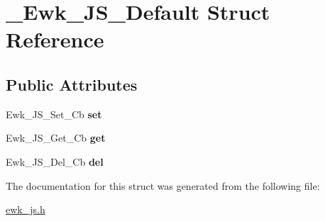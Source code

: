 \hypertarget{struct__Ewk__JS__Default}{\section{\+\_\+\+Ewk\+\_\+\+J\+S\+\_\+\+Default Struct Reference}
\label{struct__Ewk__JS__Default}
}
\subsection*{Public Attributes}
\begin{DoxyCompactItemize}
\item 
\hypertarget{struct__Ewk__JS__Default_a2e25ff1412c3e129e9ba02c422cc5dd7}{Ewk\+\_\+\+J\+S\+\_\+\+Set\+\_\+\+Cb {\bfseries set}}\label{struct__Ewk__JS__Default_a2e25ff1412c3e129e9ba02c422cc5dd7}

\item 
\hypertarget{struct__Ewk__JS__Default_af9ce21c37782350ba8bb2f7d951acf2d}{Ewk\+\_\+\+J\+S\+\_\+\+Get\+\_\+\+Cb {\bfseries get}}\label{struct__Ewk__JS__Default_af9ce21c37782350ba8bb2f7d951acf2d}

\item 
\hypertarget{struct__Ewk__JS__Default_ae347a5f1347298ddaa82ef1df538a3d0}{Ewk\+\_\+\+J\+S\+\_\+\+Del\+\_\+\+Cb {\bfseries del}}\label{struct__Ewk__JS__Default_ae347a5f1347298ddaa82ef1df538a3d0}

\end{DoxyCompactItemize}


The documentation for this struct was generated from the following file\+:\begin{DoxyCompactItemize}
\item 
\hyperlink{ewk__js_8h}{ewk\+\_\+js.\+h}\end{DoxyCompactItemize}
